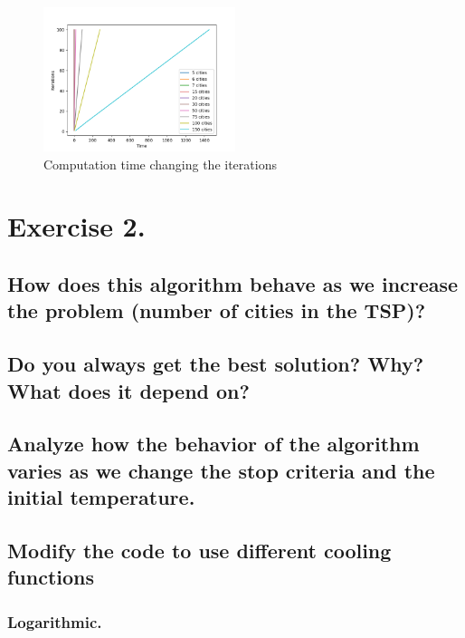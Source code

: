 \documentclass{article}
\begin{document}
        \begin{figure}[H]

            \centering
            \includegraphics[width=0.5\textwidth]{../media/03.TSP-iterative.png}
            \caption{Computation time changing the iterations}
            \label{Computation time changing the iterations}

        \end{figure}

    \newpage

    \section{Exercise 2.}

        \subsection{How does this algorithm behave as we increase the problem (number of cities in
    the TSP)?}
    
        \subsection{Do you always get the best solution? Why? What does it depend on?}
    
        \subsection{Analyze how the behavior of the algorithm varies as we change the stop criteria
    and the initial temperature.}
    
        \subsection{Modify the code to use different cooling functions}
    
            \subsubsection{Logarithmic.}
    
\end{document}
